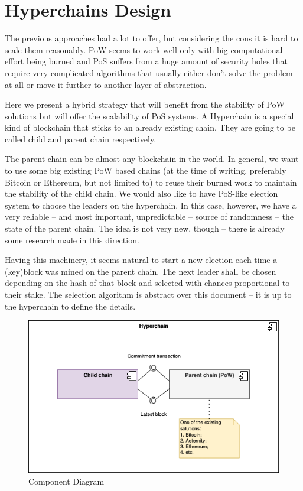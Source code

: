 \section{Hyperchains Design}
\graphicspath{ {./images/} }

The previous approaches had a lot to offer, but considering the cons it is hard
to scale them reasonably. PoW seems to work well only with big
computational effort being burned and PoS suffers from a huge amount of security
holes that require very complicated algorithms that usually either don't solve
the problem at all or move it further to another layer of abstraction.

Here we present a hybrid strategy that will benefit from the stability of PoW
solutions but will offer the scalability of PoS systems. A Hyperchain is a
special kind of blockchain that sticks to an already existing chain. They are
going to be called child and parent chain respectively\cite{hyperchains}.

The parent chain can be almost any blockchain in the world. In general, we want
to use some big existing PoW based chains (at the time of writing, preferably
Bitcoin or Ethereum, but not limited to) to reuse their burned work to maintain
the stability of the child chain. We would also like to have
PoS-like election system to choose the leaders on the hyperchain. In this case,
however, we have a very reliable – and most important, unpredictable – source
of randomness – the state of the parent chain. The idea is not very new,
though – there is already some research made in this direction\cite{blockchain_random}.

Having this machinery, it seems natural to start a new election each time a
(key)block was mined on the parent chain. The next leader shall be chosen
depending on the hash of that block and selected with chances proportional to
their stake. The selection algorithm is abstract over this document – it is
up to the hyperchain to define the details.

\begin{figure}[h]
	\caption{Component Diagram}
	\centering
	\includegraphics[scale=0.5]{hyperchain_component}
\end{figure}

